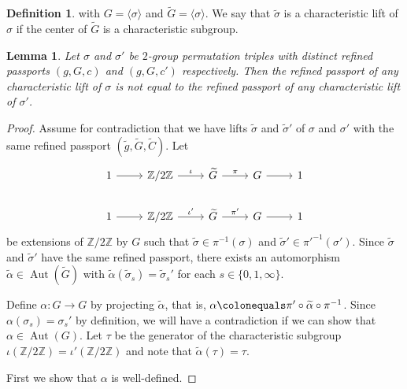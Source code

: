 \documentclass{dcthesis}
\newcommand{\ZZ}{\mathbb Z}
\newcommand{\defi}[1]{\textsf{#1}}
\newcommand{\wt}[1]{\widetilde{#1}}
\DeclareMathOperator{\Aut}{Aut}
\numberwithin{equation}{section}
\newtheorem{lemma}[equation]{Lemma}
\theoremstyle{definition}
\newtheorem{definition}[equation]{Definition}
\theoremstyle{remark}
\begin{document}
{{{\begin{definition}
      with $G=\langle\sigma\rangle$
      and $\wt{G}=\langle\sigma\rangle$.
      We say that $\wt{\sigma}$
      is a
      \defi{characteristic lift}
      of $\sigma$ if the center of
      $\wt{G}$ is a characteristic subgroup.
    \end{definition}
    \begin{lemma}
      \label{lem:identifiedinlift}
      Let $\sigma$ and $\sigma'$
      be $2$-group permutation triples
      with distinct refined passports
      $(g,G,c)$ and $(g,G,c')$ respectively.
      Then the refined passport of any
      characteristic lift
      of $\sigma$ is not equal to the refined
      passport of any
      characteristic lift of $\sigma'$.
    \end{lemma}
    \begin{proof}
      Assume for contradiction that we have
      lifts
      $\wt{\sigma}$ and $\wt{\sigma}'$
      of $\sigma$ and $\sigma'$
      with the same refined passport
      $(\wt{g},\wt{G},\wt{C})$.
      Let
      \begin{equation}
        \label{eqn:twoextensionsrefinedlemma}
        \begin{tikzcd}
          1\arrow{r}&\ZZ/2\ZZ\arrow{r}{\iota}
                    &\wt{G}\arrow{r}{\pi}
                    &G\arrow{r}&1\\
          1\arrow{r}&\ZZ/2\ZZ\arrow{r}{\iota'}
                    &\wt{G}\arrow{r}{\pi'}
                    &G\arrow{r}&1
        \end{tikzcd}
      \end{equation}
      be extensions of $\ZZ/2\ZZ$ by $G$
      such that $\wt{\sigma}\in\pi^{-1}(\sigma)$
      and $\wt{\sigma}'\in\pi'^{-1}(\sigma')$.
      Since $\wt{\sigma}$ and $\wt{\sigma}'$
      have the same refined passport,
      there exists
      an automorphism
      $\wt{\alpha}\in\Aut(\wt{G})$
      with
      $\wt{\alpha}(\wt{\sigma}_s) =
      \wt{\sigma}_s'$
      for each $s\in \{0,1,\infty\}$.
      \par
      Define $\alpha\colon G\to G$ by
      projecting $\wt{\alpha}$,
      that is,
      $\alpha\colonequals
      \pi'\circ\wt{\alpha}\circ\pi^{-1}$.
      Since $\alpha(\sigma_s)=\sigma_s'$
      by definition,
      we will have a contradiction if we can
      show that $\alpha\in\Aut(G)$.
      Let $\tau$
      be the generator of the characteristic
      subgroup
      $\iota(\ZZ/2\ZZ)=\iota'(\ZZ/2\ZZ)$
      and note that
      $\wt{\alpha}(\tau) = \tau$.
      \par
      First we show that $\alpha$ is well-defined.

\end{proof}}}}
\end{document}
